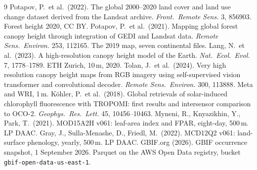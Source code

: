 \documentclass[10pt]{article}
\newcommand{\code}[1]{\texttt{#1}}
\begin{document}
\begin{thebibliography}{9}
 Potapov, P.\ et al.\ (2022). The global 2000--2020 land cover and land use change dataset derived from the Landsat archive. \emph{Front.\ Remote Sens.} 3, 856903. Forest height 2020, CC BY.
 Potapov, P.\ et al.\ (2021). Mapping global forest canopy height through integration of GEDI and Landsat data. \emph{Remote Sens.\ Environ.} 253, 112165. The 2019 map, seven continental files.
 Lang, N.\ et al.\ (2023). A high-resolution canopy height model of the Earth. \emph{Nat.\ Ecol.\ Evol.} 7, 1778--1789. ETH Zurich, 10\,m, 2020.
 Tolan, J.\ et al.\ (2024). Very high resolution canopy height maps from RGB imagery using self-supervised vision transformer and convolutional decoder. \emph{Remote Sens.\ Environ.} 300, 113888. Meta and WRI, 1\,m.
 K\"ohler, P.\ et al.\ (2018). Global retrievals of solar-induced chlorophyll fluorescence with TROPOMI: first results and intersensor comparison to OCO-2. \emph{Geophys.\ Res.\ Lett.} 45, 10456--10463.
 Myneni, R., Knyazikhin, Y., Park, T.\ (2021). MOD15A2H v061: leaf-area index and FPAR, eight-day, 500\,m. LP DAAC.
 Gray, J., Sulla-Menashe, D., Friedl, M.\ (2022). MCD12Q2 v061: land-surface phenology, yearly, 500\,m. LP DAAC.
 GBIF.org (2026). GBIF occurrence snapshot, 1 September 2026. Parquet on the AWS Open Data registry, bucket \code{gbif-open-data-us-east-1}.
\end{thebibliography}
\end{document}
